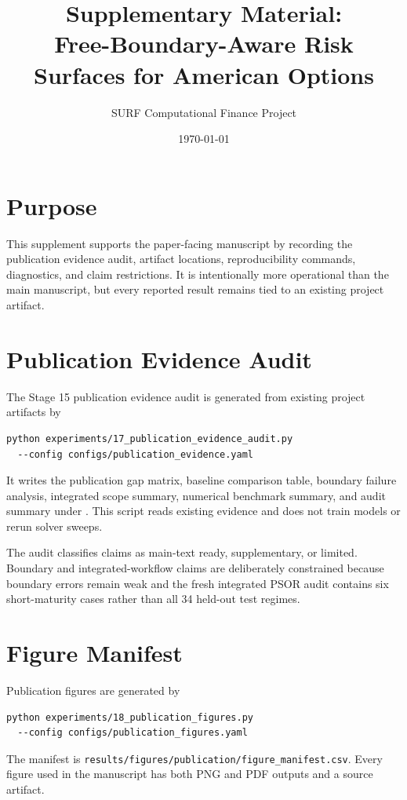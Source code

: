 \documentclass[11pt]{article}
\title{Supplementary Material:\\Free-Boundary-Aware Risk Surfaces for American Options}
\author{SURF Computational Finance Project}
\date{\today}
\begin{document}
\maketitle

\section{Purpose}

This supplement supports the paper-facing manuscript by recording the
publication evidence audit, artifact locations, reproducibility commands,
diagnostics, and claim restrictions. It is intentionally more operational than
the main manuscript, but every reported result remains tied to an existing
project artifact.

\section{Publication Evidence Audit}

The Stage 15 publication evidence audit is generated from existing project artifacts by
\begin{verbatim}
python experiments/17_publication_evidence_audit.py
  --config configs/publication_evidence.yaml
\end{verbatim}
It writes the publication gap matrix, baseline comparison table, boundary
failure analysis, integrated scope summary, numerical benchmark summary, and
audit summary under
. This script reads
existing evidence and does not train models or rerun solver sweeps.

The audit classifies claims as main-text ready, supplementary, or limited.
Boundary and integrated-workflow claims are deliberately constrained because
boundary errors remain weak and the fresh integrated PSOR audit contains six
short-maturity cases rather than all 34 held-out test regimes.

\section{Figure Manifest}

Publication figures are generated by
\begin{verbatim}
python experiments/18_publication_figures.py
  --config configs/publication_figures.yaml
\end{verbatim}
The manifest is \texttt{results/figures/publication/figure\_manifest.csv}. Every figure used in the manuscript has both PNG and PDF outputs and a source artifact.
\end{document}
